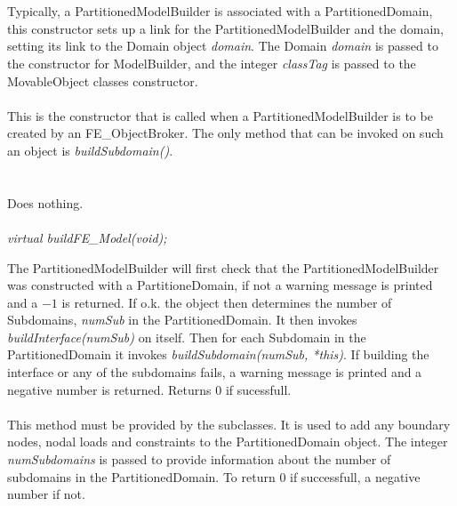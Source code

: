  \\ 
\\  
Typically, a PartitionedModelBuilder is associated with a PartitionedDomain,
this constructor sets up a link for the PartitionedModelBuilder and the domain,
setting its link to the Domain object {\em domain}. The Domain {\em
domain} is passed to the constructor for ModelBuilder, and the integer
{\em classTag} is passed to the MovableObject classes constructor. \\

\\  
This is the constructor that is called when a PartitionedModelBuilder
is to be created by an FE\_ObjectBroker. The only method that can be
invoked on such an object is {\em buildSubdomain()}. \\

 \\
\\ 
Does nothing. \\


 \\
{\em virtual buildFE\_Model(void);} 

The PartitionedModelBuilder will first check that the
PartitionedModelBuilder was constructed with a PartitioneDomain, if
not a warning message is printed and a $-1$ is returned. If o.k. the object 
then determines the number of Subdomains, {\em numSub} in the
PartitionedDomain. It then invokes {\em buildInterface(numSub)} on 
itself. Then for each Subdomain in the PartitionedDomain it invokes
{\em buildSubdomain(numSub, *this)}. If building the interface or any
of the subdomains fails, a warning message is printed and a negative
number is returned. Returns $0$ if sucessfull. \\

\\ 
This method must be provided by the subclasses. It is used to add any
boundary nodes, nodal loads and constraints to the PartitionedDomain
object. The integer {\em numSubdomains} is passed to provide
information about the number of subdomains in the
PartitionedDomain. To return $0$ if successfull, a negative number if not. \\


